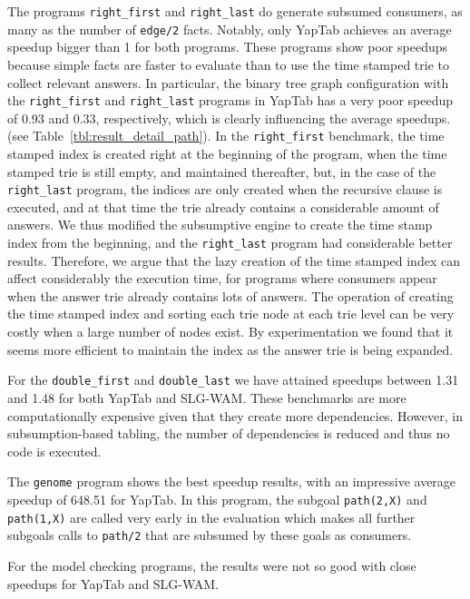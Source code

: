 The programs \texttt{right\_first} and \texttt{right\_last} do generate subsumed consumers,
as many as the number of \texttt{edge/2} facts. Notably, only YapTab
achieves an average speedup bigger than 1 for both programs. These programs show poor speedups because simple facts
are faster to evaluate than to use the time stamped trie to collect relevant answers.
In particular, the binary tree graph configuration with the \texttt{right\_first} and \texttt{right\_last} programs
in YapTab has a very poor speedup of 0.93 and 0.33, respectively, which is clearly influencing the average speedups.
(see Table~\ref{tbl:result_detail_path}).
In the \texttt{right\_first} benchmark, the time stamped index is created right at
the beginning of the program, when the time stamped trie is still empty, and maintained thereafter, but,
in the case of the \texttt{right\_last} program, the indices are only created when the recursive
clause is executed, and at that time the trie already contains a considerable amount of answers.
We thus modified the subsumptive
engine to create the time stamp index from the beginning, and the \texttt{right\_last} program had considerable
better results. Therefore, we argue that the lazy creation of the time stamped index can affect considerably the
execution time, for programs where consumers appear when the answer trie already contains lots of answers.
The operation of creating the time stamped index
and sorting each trie node at each trie level can be very costly when a large number of nodes exist.
By experimentation we found that it seems more efficient to maintain the index as the answer trie is being expanded.

For the \texttt{double\_first} and \texttt{double\_last} we have attained speedups between 1.31 and 1.48
for both YapTab and SLG-WAM. These benchmarks are more computationally expensive given that they create more
dependencies. However, in subsumption-based tabling, the number of dependencies is reduced 
and thus no code is executed.

The \texttt{genome} program shows the best speedup results, with an impressive average speedup of 
648.51 for YapTab. In this program, the subgoal \texttt{path(2,X)} and \texttt{path(1,X)} are called
very early in the evaluation which makes all further subgoals calls to \texttt{path/2} that are subsumed by these
goals as consumers.

For the model checking programs, the results were not so good with close speedups for YapTab and SLG-WAM.




